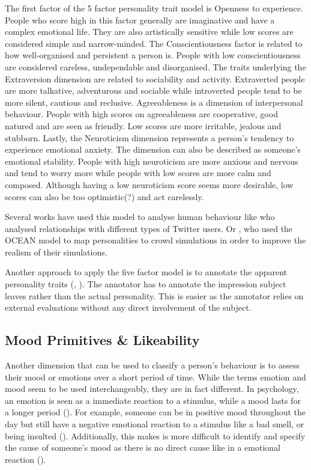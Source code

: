 The first factor of the 5 factor personality trait model is Openness to experience. People who score high in this factor generally are imaginative and have a complex emotional life. They are also artistically sensitive while low scores are considered simple and narrow-minded. The Conscientiousness factor is related to how well-organised and persistent a person is. People with low conscientiousness are considered careless, undependable and disorganised. The traits underlying the Extraversion dimension are related to sociability and activity. Extraverted people are more talkative, adventurous and sociable while introverted people tend to be more silent, cautious and reclusive. Agreeableness is a dimension of interpersonal behaviour. People with high scores on agreeableness are cooperative, good natured and are seen as friendly. Low scores are more irritable, jealous and stubborn. Lastly, the Neuroticism dimension represents a person's tendency to experience emotional anxiety. The dimension can also be described as someone's emotional stability. People with high neuroticism are more anxious and nervous and tend to worry more while people with low scores are more calm and composed. Although having a low neuroticism score seems more desirable, low scores can also be too optimistic(?) and act carelessly. 

Several works have used this model to analyse human behaviour like \textcite{quercia2011our} who analysed relationships with different types of Twitter users. Or \textcite{allbeck2008creating}, who used the OCEAN model to map personalities to crowd simulations in order to improve the realism of their simulations. 

Another approach to apply the five factor model is to annotate the apparent personality traits (\cite{junior2018first}, \cite{chen2016overcoming}). The annotator has to annotate the impression subject leaves rather than the actual personality. This is easier as the annotator relies on external evaluations without any direct involvement of the subject. 

\subsection{Mood Primitives \& Likeability}
Another dimension that can be used to classify a person's behaviour is to assess their mood or emotions over a short period of time. While the terms emotion and mood seem to be used interchangeably, they are in fact different. In psychology, an emotion is seen as a immediate reaction to a stimulus, while a mood lasts for a longer period (\cite{bower2000affectmemory}). For example, someone can be in positive mood throughout the day but still have a negative emotional reaction to a stimulus like a bad smell, or being insulted (\cite{matlin2012cognition}). Additionally, this makes is more difficult to identify and specify the cause of someone's mood as there is no direct cause like in a emotional reaction (\cite{desmet2016mood}).

